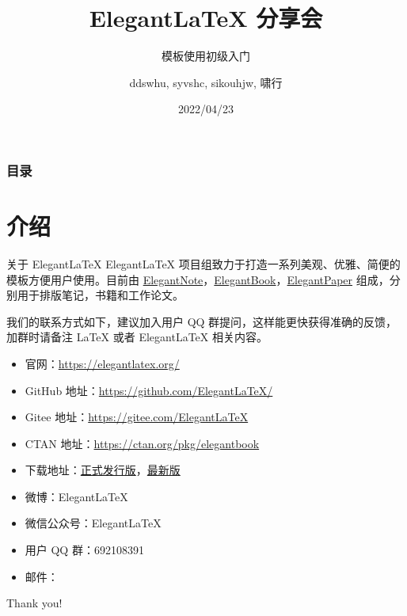 \documentclass[9pt]{beamer}
\author{ddswhu, syvshc, sikouhjw, 啸行}
\title{Elegant\LaTeX{} 分享会}
\subtitle{模板使用初级入门}
\institute{ElegantLaTeX Program}
\date{2022/04/23}
\begin{document}
\maketitle


\begin{frame}\frametitle{目录}
\tableofcontents
\end{frame}


\section{介绍}

\begin{frame}{关于 ElegantLaTeX}
Elegant\LaTeX{} 项目组致力于打造一系列美观、优雅、简便的模板方便用户使用。目前由 \href{https://github.com/ElegantLaTeX/ElegantNote}{ElegantNote}，\href{https://github.com/ElegantLaTeX/ElegantBook}{ElegantBook}，\href{https://github.com/ElegantLaTeX/ElegantPaper}{ElegantPaper} 组成，分别用于排版笔记，书籍和工作论文。

我们的联系方式如下，建议加入用户 QQ 群提问，这样能更快获得准确的反馈，加群时请备注 \LaTeX{} 或者 Elegant\LaTeX{} 相关内容。
\begin{itemize}
  \item 官网：\href{https://elegantlatex.org/}{https://elegantlatex.org/}
  \item GitHub 地址：\href{https://github.com/ElegantLaTeX/}{https://github.com/ElegantLaTeX/}
  \item Gitee 地址：\href{https://gitee.com/ElegantLaTeX}{https://gitee.com/ElegantLaTeX}
  \item CTAN 地址：\href{https://ctan.org/pkg/elegantbook}{https://ctan.org/pkg/elegantbook}
  \item 下载地址：\href{https://github.com/ElegantLaTeX/ElegantBook/releases}{正式发行版}，\href{https://github.com/ElegantLaTeX/ElegantBook/archive/master.zip}{最新版}
  \item 微博：Elegant\LaTeX{}
  \item 微信公众号：Elegant\LaTeX{}
  \item 用户 QQ 群：692108391
  \item 邮件：
\end{itemize}
\end{frame}



\begin{frame}[standout]
  Thank you!
\end{frame}
\end{document}
